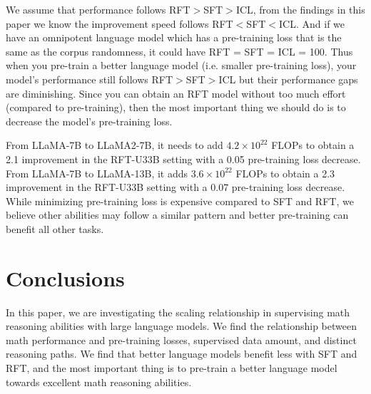 We assume that performance follows RFT$>$SFT$>$ICL, from the findings in this paper we know the improvement speed follows RFT$<$SFT$<$ICL. And if we have an omnipotent language model which has a pre-training loss that is the same as the corpus randomness, it could have RFT = SFT = ICL = 100. Thus when you pre-train a better language model (i.e. smaller pre-training loss), your model's performance still follows RFT$>$SFT$>$ICL but their performance gaps are diminishing. Since you can obtain an RFT model without too much effort (compared to pre-training), then the most important thing we should do is to decrease the model's pre-training loss.

From LLaMA-7B to LLaMA2-7B, it needs to add $4.2\times 10^{22}$ FLOPs to obtain a 2.1 improvement in the RFT-U33B setting with a 0.05 pre-training loss decrease. From LLaMA-7B to LLaMA-13B, it adds $3.6\times 10^{22}$ FLOPs to obtain a 2.3 improvement in the RFT-U33B setting with a 0.07 pre-training loss decrease. While minimizing pre-training loss is expensive compared to SFT and RFT, we believe other abilities may follow a similar pattern and better pre-training can benefit all other tasks.

\section{Conclusions}
In this paper, we are investigating the scaling relationship in supervising math reasoning abilities with large language models. We find the relationship between math performance and pre-training losses, supervised data amount, and distinct reasoning paths. We find that better language models benefit less with SFT and RFT, and the most important thing is to pre-train a better language model towards excellent math reasoning abilities.


